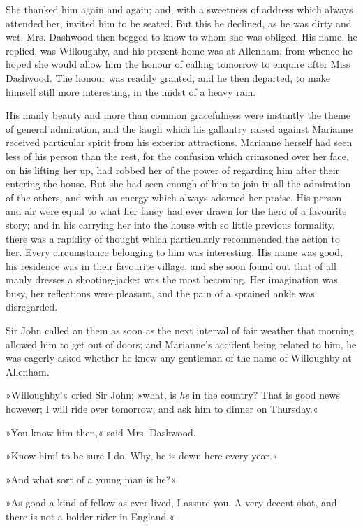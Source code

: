 She thanked him again and again; and, with a sweetness of address which always attended her, invited him to be seated. But this he declined, as he was dirty and wet. Mrs. Dashwood then begged to know to whom she was obliged. His name, he replied, was Willoughby, and his present home was at Allenham, from whence he hoped she would allow him the honour of calling tomorrow to enquire after Miss Dashwood. The honour was readily granted, and he then departed, to make himself still more interesting, in the midst of a heavy rain.

His manly beauty and more than common gracefulness were instantly the theme of general admiration, and the laugh which his gallantry raised against Marianne received particular spirit from his exterior attractions. Marianne herself had seen less of his person than the rest, for the confusion which crimsoned over her face, on his lifting her up, had robbed her of the power of regarding him after their entering the house. But she had seen enough of him to join in all the admiration of the others, and with an energy which always adorned her praise. His person and air were equal to what her fancy had ever drawn for the hero of a favourite story; and in his carrying her into the house with so little previous formality, there was a rapidity of thought which particularly recommended the action to her. Every circumstance belonging to him was interesting. His name was good, his residence was in their favourite village, and she soon found out that of all manly dresses a shooting-jacket was the most becoming. Her imagination was busy, her reflections were pleasant, and the pain of a sprained ankle was disregarded.

Sir John called on them as soon as the next interval of fair weather that morning allowed him to get out of doors; and Marianne’s accident being related to him, he was eagerly asked whether he knew any gentleman of the name of Willoughby at Allenham.

»Willoughby!« cried Sir John; »what, is \textit{he} in the country? That is good news however; I will ride over tomorrow, and ask him to dinner on Thursday.«

»You know him then,« said Mrs. Dashwood.

»Know him! to be sure I do. Why, he is down here every year.«

»And what sort of a young man is he?«

»As good a kind of fellow as ever lived, I assure you. A very decent shot, and there is not a bolder rider in England.«


